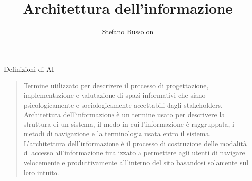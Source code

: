 \documentclass[pdf,mpa]{prosper}
\begin{document}


\title{Architettura dell'informazione}
\author{Stefano Bussolon}



\maketitle


\begin{slide}{Definizioni di AI}
\begin{quotation}
Termine utilizzato per descrivere il processo di progettazione, implementazione e valutazione di spazi informativi che siano psicologicamente e sociologicamente accettabili dagli stakeholders. \citep{Dillon2002}\\
Architettura dell'informazione è un termine usato per descrivere la struttura di un sistema, il modo in cui l'informazione è raggruppata, i metodi di navigazione e la terminologia usata entro il sistema. 
L'architettura dell'informazione è il processo di costruzione delle modalità di accesso all'informazione finalizzato a permettere agli utenti di navigare velocemente e produttivamente all'interno del sito basandosi solamente sul loro intuito. \citep{McCracken2005}\\
\end{quotation}

\end{slide}
\end{document}
